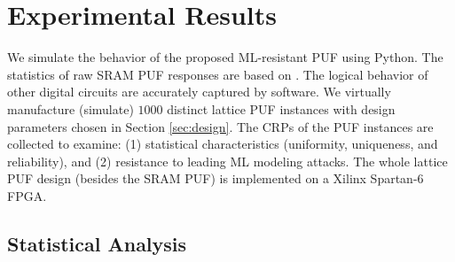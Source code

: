 \section{Experimental Results}
\label{sec:result}

We simulate the behavior of the proposed ML-resistant PUF using Python. The statistics of raw SRAM PUF responses are based on \cite{maes2013accurate, maes2009soft}. The logical behavior of other digital circuits are accurately captured by software. We virtually manufacture (simulate) $1000$ distinct lattice PUF instances with design parameters chosen in Section \ref{sec:design}. The CRPs of the PUF instances are collected to examine: (1) statistical characteristics (uniformity, uniqueness, and reliability), and (2) resistance to leading ML modeling attacks. The whole lattice PUF design (besides the SRAM PUF) is implemented on a Xilinx Spartan-6 FPGA.


\subsection{Statistical Analysis}
\label{sec:statistical_result}



